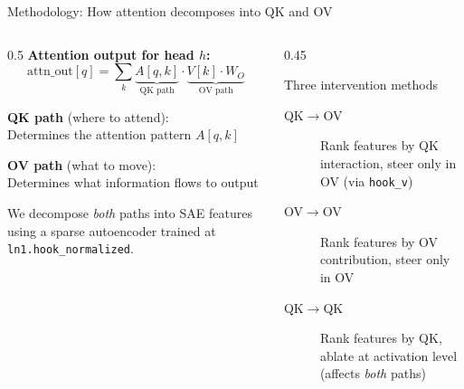 \documentclass[aspectratio=169]{beamer}
\begin{document}
\begin{frame}{Methodology: How attention decomposes into QK and OV}
\begin{columns}
\begin{column}{0.5\textwidth}
\textbf{Attention output for head $h$:}
\[
\text{attn\_out}[q] = \sum_k \underbrace{A[q,k]}_{\text{QK path}} \cdot \underbrace{V[k] \cdot W_O}_{\text{OV path}}
\]

\textbf{QK path} (where to attend):\\
Determines the attention pattern $A[q,k]$

\vspace{0.5em}
\textbf{OV path} (what to move):\\
Determines what information flows to output

\vspace{0.5em}
We decompose \textit{both} paths into SAE features using a sparse autoencoder trained at \texttt{ln1.hook\_normalized}.
\end{column}
\begin{column}{0.45\textwidth}
\begin{block}{Three intervention methods}
\begin{description}
    \item[\textcolor{qkov}{QK$\to$OV}] Rank features by QK interaction, steer only in OV (via \texttt{hook\_v})
    \item[\textcolor{ovov}{OV$\to$OV}] Rank features by OV contribution, steer only in OV
    \item[\textcolor{qkqk}{QK$\to$QK}] Rank features by QK, ablate at activation level (affects \textit{both} paths)
\end{description}
\end{block}
\end{column}
\end{columns}
\end{frame}
\end{document}
